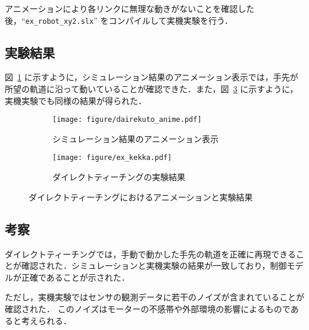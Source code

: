 アニメーションにより各リンクに無理な動きがないことを確認した後，“\texttt{ex\_robot\_xy2.slx}” をコンパイルして実機実験を行う．

\subsection{実験結果}
図~\ref{fig:direct_teaching_anim} に示すように，シミュレーション結果のアニメーション表示では，手先が所望の軌道に沿って動いていることが確認できた．また，図~\ref{fig:direct_teaching_result} に示すように，実機実験でも同様の結果が得られた．

\begin{figure}[H]
    \centering
    \begin{subfigure}[b]{0.45\linewidth}
        \centering
        \texttt{[image: figure/dairekuto\_anime.pdf]}
        \caption{シミュレーション結果のアニメーション表示}
        \label{fig:direct_teaching_anim}
    \end{subfigure}
    \begin{subfigure}[b]{0.45\linewidth}
        \centering
        \texttt{[image: figure/ex\_kekka.pdf]}
        \caption{ダイレクトティーチングの実験結果}
        \label{fig:direct_teaching_result}
    \end{subfigure}
    \caption{ダイレクトティーチングにおけるアニメーションと実験結果}
\end{figure}

\subsection{考察}
ダイレクトティーチングでは，手動で動かした手先の軌道を正確に再現できることが確認された．シミュレーションと実機実験の結果が一致しており，制御モデルが正確であることが示された．

ただし，実機実験ではセンサの観測データに若干のノイズが含まれていることが確認された．
このノイズはモーターの不感帯や外部環境の影響によるものであると考えられる．
